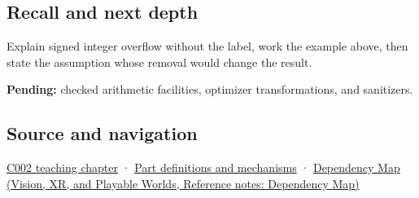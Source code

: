 \subsection{Recall and next depth}\label{appendix-1a599c924a4e-recall-and-next-depth}

Explain signed integer overflow without the label, work the example above, then state the assumption whose removal would change the result.

\textbf{Pending:} checked arithmetic facilities, optimizer transformations, and sanitizers.

\subsection{Source and navigation}\label{appendix-1a599c924a4e-source-and-navigation}

\hyperref[01-foundations-i-ch001-arithmetic-becomes-a-policy]{C002 teaching chapter} · \hyperref[appendix-fd090d982a15]{Part definitions and mechanisms} · \href{../07-Vision-XR-and-Playable-Worlds/main.pdf\#nameddest=appendix-4ad47bdd269a}{Dependency Map (Vision, XR, and Playable Worlds, Reference notes: Dependency Map)}
